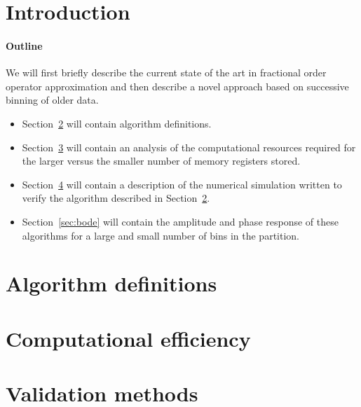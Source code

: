 \documentclass[preprint,12pt]{elsarticle}
\begin{document}

\section{Introduction}\label{sec:intro}
\setcounter{section}{1}
\setcounter{equation}{0}



\paragraph{Outline\\}
We will first briefly describe the current state of the art in
fractional order operator approximation and then describe a novel
approach based on successive binning of older data.

\begin{itemize} 
\item Section~\ref{sec:algorithmDefn} will contain algorithm definitions. 
\item  Section~\ref{sec:computation} will contain an analysis of the
  computational resources required for the larger versus the smaller
  number of memory registers stored.
\item Section~\ref{sec:methods} will contain a description of the
  numerical simulation written to verify the algorithm described in
  Section~\ref{sec:algorithmDefn}.
\item Section~\ref{sec:bode} will contain the amplitude and phase response
  of these algorithms for a large and small number of bins in the
  partition.
\end{itemize}


\section{Algorithm definitions}\label{sec:algorithmDefn}



\section{Computational efficiency}\label{sec:computation}



\section{Validation methods}\label{sec:methods}

\end{document}
